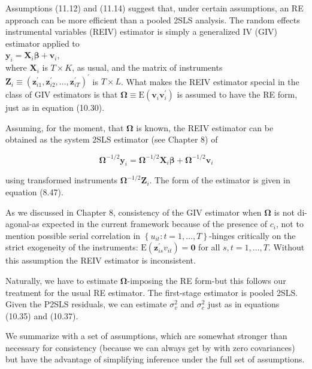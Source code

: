 \documentclass[10pt]{article}
\begin{document}
Assumptions (11.12) and (11.14) suggest that, under certain assumptions, an RE approach can be more efficient than a pooled 2SLS analysis. The random effects instrumental variables (REIV) estimator is simply a generalized IV (GIV) estimator applied to\\
$\mathbf{y}_{i}=\mathbf{X}_{i} \boldsymbol{\beta}+\mathbf{v}_{i}$,\\
where $\mathbf{X}_{i}$ is $T \times K$, as usual, and the matrix of instruments $\mathbf{Z}_{i} \equiv\left(\mathbf{z}_{i 1}^{\prime}, \mathbf{z}_{i 2}^{\prime}, \ldots, \mathbf{z}_{i T}^{\prime}\right)^{\prime}$ is $T \times L$. What makes the REIV estimator special in the class of GIV estimators is that $\boldsymbol{\Omega} \equiv \mathrm{E}\left(\mathbf{v}_{i} \mathbf{v}_{i}^{\prime}\right)$ is assumed to have the RE form, just as in equation (10.30).

Assuming, for the moment, that $\boldsymbol{\Omega}$ is known, the REIV estimator can be obtained as the system 2SLS estimator (see Chapter 8) of


\begin{equation*}
\boldsymbol{\Omega}^{-1 / 2} \mathbf{y}_{i}=\boldsymbol{\Omega}^{-1 / 2} \mathbf{X}_{i} \boldsymbol{\beta}+\boldsymbol{\Omega}^{-1 / 2} \mathbf{v}_{i} \tag{11.16}
\end{equation*}


using transformed instruments $\boldsymbol{\Omega}^{-1 / 2} \mathbf{Z}_{i}$. The form of the estimator is given in equation (8.47).

As we discussed in Chapter 8, consistency of the GIV estimator when $\boldsymbol{\Omega}$ is not di-agonal-as expected in the current framework because of the presence of $c_{i}$, not to mention possible serial correlation in $\left\{u_{i t}: t=1, \ldots, T\right\}$-hinges critically on the strict exogeneity of the instruments: $\mathrm{E}\left(\mathbf{z}_{i s}^{\prime} v_{i t}\right)=\mathbf{0}$ for all $s, t=1, \ldots, T$. Without this assumption the REIV estimator is inconsistent.

Naturally, we have to estimate $\boldsymbol{\Omega}$-imposing the RE form-but this follows our treatment for the usual RE estimator. The first-stage estimator is pooled 2SLS. Given the P2SLS residuals, we can estimate $\sigma_{v}^{2}$ and $\sigma_{c}^{2}$ just as in equations (10.35) and (10.37).

We summarize with a set of assumptions, which are somewhat stronger than necessary for consistency (because we can always get by with zero covariances) but have the advantage of simplifying inference under the full set of assumptions.
\end{document}
